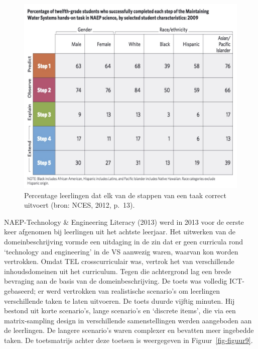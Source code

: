 \documentclass[
  letterpaper,
]{report}
\begin{document}
\begin{figure}

{\centering \includegraphics{./FIG8.jpg}

}

\caption{\label{fig-figuur8}Percentage leerlingen dat elk van de stappen
van een taak correct uitvoert (bron: NCES, 2012, p.~13).}

\end{figure}

NAEP-Technology \& Engineering Literacy (2013) werd in 2013 voor de
eerste keer afgenomen bij leerlingen uit het achtste leerjaar. Het
uitwerken van de domeinbeschrijving vormde een uitdaging in de zin dat
er geen curricula rond `technology and engineering' in de VS aanwezig
waren, waarvan kon worden vertrokken. Omdat TEL crosscurriculair was,
vertrok het van verschillende inhoudsdomeinen uit het curriculum. Tegen
die achtergrond lag een brede bevraging aan de basis van de
domeinbeschrijving. De toets was volledig ICT-gebaseerd; er werd
vertrokken van realistische scenario's om leerlingen verschillende taken
te laten uitvoeren. De toets duurde vijftig minuten. Hij bestond uit
korte scenario's, lange scenario's en `discrete items', die via een
matrix-sampling design in verschillende samenstellingen werden
aangeboden aan de leerlingen. De langere scenario's waren complexer en
bevatten meer ingebedde taken. De toetsmatrijs achter deze toetsen is
weergegeven in Figuur~\ref{fig-figuur9}.
\end{document}
